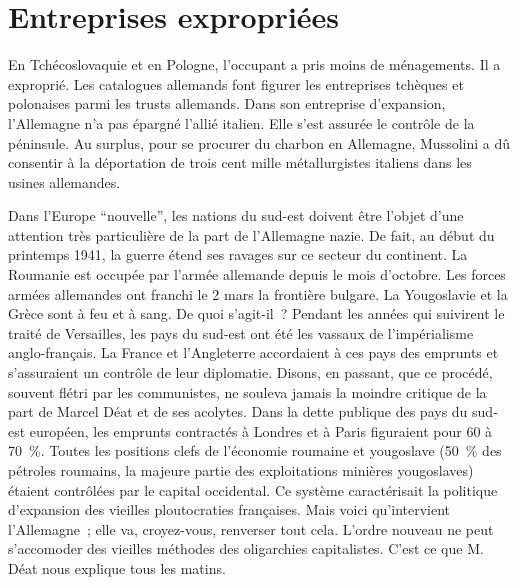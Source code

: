 \documentclass[french,twoside]{book} %
\begin{document}
\section[Entreprises expropriées]{Entreprises expropriées}
\noindent En Tchécoslovaquie et en Pologne, l’occupant a pris moins de ménagements. Il a exproprié. Les catalogues allemands font figurer les entreprises tchèques et polonaises parmi les trusts allemands. Dans son entreprise d’expansion, l’Allemagne n’a pas épargné l’allié italien. Elle s’est assurée le contrôle de la péninsule. Au surplus, pour se procurer du charbon en Allemagne, Mussolini a dû consentir à la déportation de trois cent mille métallurgistes italiens dans les usines allemandes.\par
Dans l’Europe “nouvelle”, les nations du sud-est doivent être l’objet d’une attention très particulière de la part de l’Allemagne nazie. De fait, au début du printemps 1941, la guerre étend ses ravages sur ce secteur du continent. La Roumanie est occupée par l’armée allemande depuis le mois d’octobre. Les forces armées allemandes ont franchi le 2 mars la frontière bulgare. La Yougoslavie et la Grèce sont à feu et à sang. De quoi s’agit-il ? Pendant les années qui suivirent le traité de Versailles, les pays du sud-est ont été les vassaux de l’impérialisme anglo-français. La France et l’Angleterre accordaient à ces pays des emprunts et s’assuraient un contrôle de leur diplomatie. Disons, en passant, que ce procédé, souvent flétri par les communistes, ne souleva jamais la moindre critique de la part de Marcel Déat et de ses acolytes. Dans la dette publique des pays du sud-est européen, les emprunts contractés à Londres et à Paris figuraient pour 60 à 70 \%. Toutes les positions clefs de l’économie roumaine et yougoslave (50 \% des pétroles roumains, la majeure partie des exploitations minières yougoslaves) étaient contrôlées par le capital occidental. Ce système caractérisait la politique d’expansion des vieilles ploutocraties françaises. Mais voici qu’intervient l’Allemagne ; elle va, croyez-vous, renverser tout cela. L’ordre nouveau ne peut s’accomoder des vieilles méthodes des oligarchies capitalistes. C’est ce que M. Déat nous explique tous les matins.\par
\end{document}
